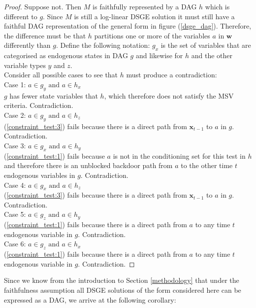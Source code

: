 \documentclass{article}
\begin{document}
\begin{proof}
  Suppose not. Then $M$ is faithfully represented by a DAG $h$ which is different to $g$. Since $M$ is still a log-linear DSGE solution it must still have a faithful DAG representation of the general form in figure (\ref{dsge_dag}). Therefore, the difference must be that $h$ partitions one or more of the variables $a$ in $\mathbf{w}$ differently than $g$. Define the following notation: $g_x$ is the set of variables that are categorised as endogenous states in DAG  $g$ and likewise for $h$ and the other variable types $y$ and $z$. \\
  Consider all possible cases to see that $h$ must produce a contradiction: \\
  Case 1: $a \in g_y \text{ and } a \in h_x$ \\
    $g$ has fewer state variables that $h$, which therefore does not satisfy the MSV criteria. Contradiction. \\
  Case 2: $a \in g_y \text{ and } a \in h_z$ \\
    (\ref{constraint_test:3}) fails because there is a direct path from $\mathbf{x}_{t-1}$ to $a$ in $g$. Contradiction. \\
  Case 3: $a \in g_x \text{ and } a \in h_y$ \\
    (\ref{constraint_test:1}) fails because $a$ is not in the conditioning set for this test in $h$ and therefore there is an unblocked backdoor path from $a$ to the other time $t$ endogenous variables in $g$. Contradiction. \\
  Case 4: $a \in g_x \text{ and } a \in h_z$ \\
    (\ref{constraint_test:3}) fails because there is a direct path from $\mathbf{x}_{t-1}$ to $a$ in $g$. Contradiction. \\
  Case 5: $a \in g_z \text{ and } a \in h_y$ \\
    (\ref{constraint_test:1}) fails because there is a direct path from $a$ to any time $t$ endogenous variable in $g$. Contradiction. \\
  Case 6: $a \in g_z \text{ and } a \in h_x$ \\
    (\ref{constraint_test:1}) fails because there is a direct path from $a$ to any time $t$ endogenous variable in $g$. Contradiction. 
\end{proof}

Since we know from the introduction to Section \ref{methodology} that under the faithfulness assumption all DSGE solutions of the form considered here can be expressed as a DAG, we arrive at the following corollary:
\end{document}
